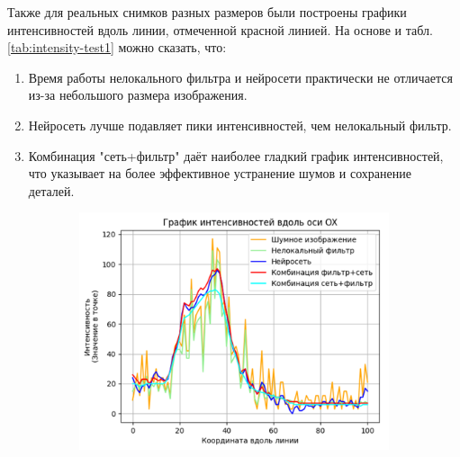 \par Также для реальных снимков разных размеров были построены графики интенсивностей вдоль линии, отмеченной красной линией. На основе и табл. \ref{tab:intensity-test1} можно сказать, что:
\begin{enumerate}[]
	\item Время работы нелокального фильтра и нейросети практически не отличается из-за небольшого размера изображения.
	\item Нейросеть лучше подавляет пики интенсивностей, чем нелокальный фильтр.
	\item Комбинация "сеть+фильтр" даёт наиболее гладкий график интенсивностей, что указывает на более эффективное устранение шумов и сохранение деталей.
\end{enumerate}
\begin{figure}[H]
	\begin{subfigure}[t]{0.6\textwidth\relax}
		\centering
		\includegraphics[width=.95\linewidth,valign=t]{my_folder/images/denoising/intensity_test1.png}
	\end{subfigure}
	\hfill %
	\begin{subfigure}[t]{0.3\textwidth\relax}
		\centering

\end{subfigure}
\end{figure}

